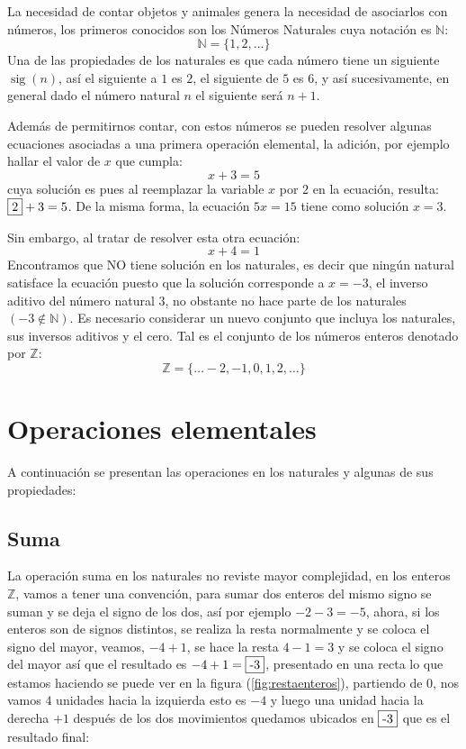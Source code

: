 La necesidad de contar objetos y animales genera la necesidad de asociarlos con números, los primeros conocidos son los Números Naturales cuya notación es $\mathbb{N}$:
\[ \mathbb{N}=\{ 1,2,\dots\} \]
Una de las propiedades de los naturales es que cada número tiene un siguiente $\operatorname{sig}(n)$, así el siguiente a $1$ es $2$, el siguiente de $5$ es $6$, y así sucesivamente, en general dado el número natural $n$ el siguiente será $n+1$.

Además de permitirnos contar, con estos números se pueden resolver algunas ecuaciones asociadas a una primera operación elemental, la adición, por ejemplo hallar el valor de $x$ que cumpla:
\[ x+3=5 \]
cuya solución es  pues al reemplazar la variable $x$ por $2$ en la ecuación, resulta: $\fbox{2}+3=5$. De la misma forma, la ecuación $5x=15$ tiene como solución $x=3$.

Sin embargo, al tratar de resolver esta otra ecuación:
\[ x+4=1 \]
Encontramos que NO tiene solución en los naturales, es decir que ningún natural satisface la ecuación puesto que la solución corresponde a $x=-3$, el inverso aditivo del número natural $3$, no obstante no hace parte de los naturales $(-3\notin\mathbb{N})$. Es necesario considerar un nuevo conjunto que incluya los naturales, sus inversos aditivos y el cero. Tal es el conjunto de los números enteros denotado por $\mathbb{Z}$:
\[ \mathbb{Z}=\{\dots -2,-1,0, 1,2,\dots\} \]

\section{Operaciones elementales}
A continuación se presentan las operaciones en los naturales y algunas de sus propiedades:

\subsection*{Suma}
La operación suma en los naturales no reviste mayor complejidad, en los enteros $\mathbb{Z}$, vamos a tener una convención, para sumar dos enteros del mismo signo se suman y se deja el signo de los dos, así por ejemplo $-2-3=-5$, ahora, si los enteros son de signos distintos, se realiza la resta normalmente y se coloca el signo del mayor, veamos, $-4+1$, se hace la resta $4-1=3$ y se coloca el signo del mayor así que el resultado es $-4+1=\fbox{-3}$, presentado en una recta lo que estamos haciendo se puede ver en la figura (\ref{fig:restaenteros}), partiendo de $0$, nos vamos $4$ unidades hacia la izquierda esto es $-4$ y luego una unidad hacia la derecha $+1$ después de los dos movimientos quedamos ubicados en $\fbox{-3}$ que es el resultado final:

